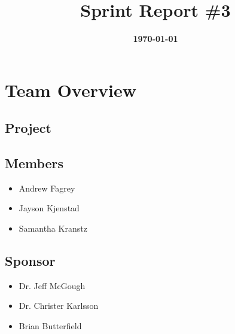 \documentclass{article}
\title{\normalfont\Large\bfseries\color{TitleColor}Sprint Report \#3}
\date{\normalfont\bfseries\color{TitleColor}\today}
\begin{document}
\maketitle

\section*{Team Overview}
\subsection*{Project}

\subsection*{Members}
\begin{itemize}
	\item Andrew Fagrey
	\item Jayson Kjenstad
	\item Samantha Kranstz
\end{itemize}

\subsection*{Sponsor}
\begin{itemize}
	\item Dr. Jeff McGough
	\item Dr. Christer Karlsson
	\item Brian Butterfield
\end{itemize}
\end{document}

